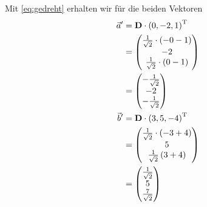 Mit \eqref{eq:gedreht} erhalten wir für die beiden Vektoren
\begin{align*}
    \vec a' &= \mat D \cdot \del{0,-2,1}^\text{T} \\
            &= \begin{pmatrix}
    \frac{1}{\sqrt{2}}\cdot\del{-0 - 1} \\
    -2 \\
    \frac{1}{\sqrt{2}}\cdot\del{0 - 1}
    \end{pmatrix} \\
    &= \begin{pmatrix}
    -\frac1{\sqrt2} \\
    -2 \\
    -\frac1{\sqrt2}
\end{pmatrix} \\
    \vec b' &= \mat D \cdot \del{3,5,-4}^\text{T} \\
            &= \begin{pmatrix}
    \frac1{\sqrt2}\cdot\del{-3+4} \\
        5 \\
        \frac1{\sqrt{2}}\del{3+4}
    \end{pmatrix} \\
    &= \begin{pmatrix}
    \frac1{\sqrt2} \\
    5 \\
    \frac7{\sqrt2}
\end{pmatrix}
\end{align*}

\subsection{}

